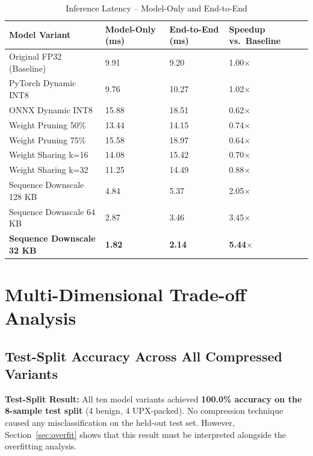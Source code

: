 \documentclass[12pt,a4paper]{article}
\begin{document}
\begin{table}[h!]
\centering
\caption{Inference Latency -- Model-Only and End-to-End}
\renewcommand{\arraystretch}{1.4}
\begin{tabular}{L{4.5cm} R{2.5cm} R{2.5cm} R{2.5cm}}
\toprule
{}
\color{white}\textbf{Model Variant} &
\color{white}\textbf{Model-Only (ms)} &
\color{white}\textbf{End-to-End (ms)} &
\color{white}\textbf{Speedup vs.\ Baseline} \\
\midrule
Original FP32 (Baseline)          &  9.91 &  9.20 & 1.00$\times$ \\
PyTorch Dynamic INT8              &  9.76 & 10.27 & 1.02$\times$ \\
ONNX Dynamic INT8                 & 15.88 & 18.51 & 0.62$\times$ \\
Weight Pruning 50\%               & 13.44 & 14.15 & 0.74$\times$ \\
Weight Pruning 75\%               & 15.58 & 18.97 & 0.64$\times$ \\
Weight Sharing k=16               & 14.08 & 15.42 & 0.70$\times$ \\
Weight Sharing k=32               & 11.25 & 14.49 & 0.88$\times$ \\
Sequence Downscale 128 KB         &  4.84 &  5.37 & 2.05$\times$ \\
Sequence Downscale 64 KB          &  2.87 &  3.46 & 3.45$\times$ \\
\textbf{Sequence Downscale 32 KB} & \textbf{1.82} &  \textbf{2.14} & \textbf{5.44}$\times$ \\
\bottomrule
\end{tabular}
\end{table}

\section{Multi-Dimensional Trade-off Analysis}

\subsection{Test-Split Accuracy Across All Compressed Variants}

\begin{tcolorbox}[resultbox]
\textbf{Test-Split Result:} All ten model variants achieved \textbf{100.0\% accuracy
on the 8-sample test split} (4 benign, 4 UPX-packed).  No compression technique
caused any misclassification on the held-out test set.  However, Section~\ref{sec:overfit}
shows that this result must be interpreted alongside the overfitting analysis.
\end{tcolorbox}
\end{document}
